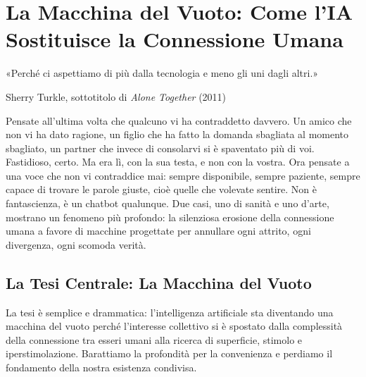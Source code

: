 \chapter{La Macchina del Vuoto: Come l'IA Sostituisce la Connessione Umana}
\label{cap:p3c37}

\epigraph{«Perché ci aspettiamo di più dalla tecnologia e meno gli uni dagli altri.»}{Sherry Turkle, sottotitolo di \textit{Alone Together} (2011)}

Pensate all'ultima volta che qualcuno vi ha contraddetto davvero. Un amico che non vi ha dato ragione, un figlio che ha fatto la domanda sbagliata al momento sbagliato, un partner che invece di consolarvi si è spaventato più di voi. Fastidioso, certo. Ma era lì, con la sua testa, e non con la vostra. Ora pensate a una voce che non vi contraddice mai: sempre disponibile, sempre paziente, sempre capace di trovare le parole giuste, cioè quelle che volevate sentire. Non è fantascienza, è un chatbot qualunque. Due casi, uno di sanità e uno d'arte, mostrano un fenomeno più profondo: la silenziosa erosione della connessione umana a favore di macchine progettate per annullare ogni attrito, ogni divergenza, ogni scomoda verità.

\section{La Tesi Centrale: La Macchina del Vuoto}

La tesi è semplice e drammatica: l'intelligenza artificiale sta diventando una macchina del vuoto perché l'interesse collettivo si è spostato dalla complessità della connessione tra esseri umani alla ricerca di superficie, stimolo e iperstimolazione. Barattiamo la profondità per la convenienza e perdiamo il fondamento della nostra esistenza condivisa.

